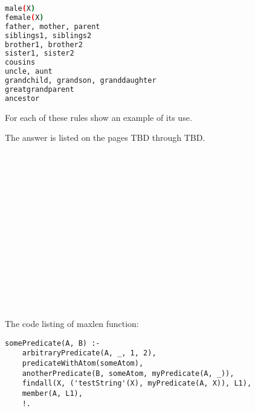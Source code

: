\documentclass{article}
\begin{document}
	\begin{lstlisting}[language=bash]
male(X)
female(X)
father, mother, parent
siblings1, siblings2
brother1, brother2
sister1, sister2
cousins
uncle, aunt
grandchild, grandson, granddaughter
greatgrandparent
ancestor
	\end{lstlisting}
	
	For each of these rules show an example of its use.
	\newline
	
	The answer is listed on the pages TBD through TBD.

\paragraph{}\
\paragraph{}\
\paragraph{}\
\paragraph{}\
\paragraph{}\
\paragraph{}\
\paragraph{}\



\noindent The code listing of maxlen function:
\ttfamily
	
\begin{verbatim} 
somePredicate(A, B) :-
    arbitraryPredicate(A, _, 1, 2),
    predicateWithAtom(someAtom),
    anotherPredicate(B, someAtom, myPredicate(A, _)),
    findall(X, ('testString'(X), myPredicate(A, X)), L1),
    member(A, L1),
    !.
\end{verbatim}
	

\paragraph{}\
\paragraph{}\
\end{document}

